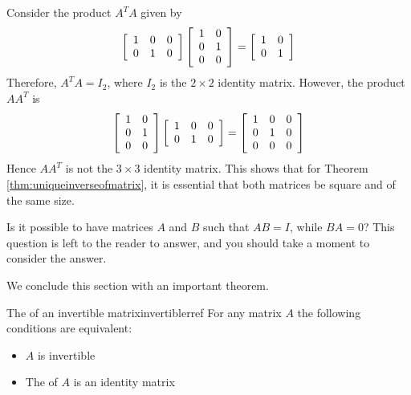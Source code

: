\begin{solution}
Consider the product $A^{T}A$ given by 
\begin{equation*}
\left[
\begin{array}{rrr}
1 & 0 & 0\\
0 & 1 & 0
\end{array}
\right]
\left[
\begin{array}{rr}
1 & 0 \\
0 & 1 \\
0 & 0 
\end{array}
\right]
=
\left[
\begin{array}{rr}
1 & 0 \\
0 & 1
\end{array}
\right]
\end{equation*}
Therefore, $A^{T}A = I_2$, where $I_2$ is the $2 \times 2$ identity matrix.
However, the product $AA^{T}$ is 
\begin{equation*}
\left[
\begin{array}{rr}
1 & 0 \\
0 & 1 \\
0 & 0 
\end{array}
\right]
\left[
\begin{array}{rrr}
1 & 0 & 0\\
0 & 1 & 0
\end{array}
\right]
=
\left[
\begin{array}{rrr}
1 & 0 & 0 \\
0 & 1 & 0 \\
0 & 0 & 0
\end{array}
\right]
\end{equation*}
Hence $AA^{T}$ is not the $3 \times 3$ identity matrix. This shows that for Theorem \ref{thm:uniqueinverseofmatrix}, it is essential that both matrices be square and of the same size.
\end{solution}

Is it possible to have matrices $A$ and $B$ such that $AB=I$, while $BA=0$? This question is left to the reader to answer, and you should take a moment to consider the answer.

We conclude this section with an important theorem.

\begin{theorem}{The {\rref} of an invertible matrix}{invertiblerref}
For any matrix $A$ the following conditions are equivalent:
\begin{itemize}
\item $A$ is invertible
\item The {\rref} of $A$ is an identity matrix
\end{itemize}
\end{theorem}

